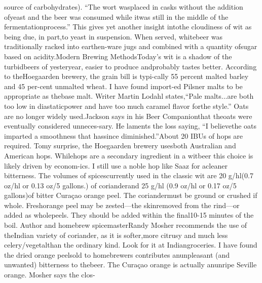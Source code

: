 \documentclass[a4paper,parskip=half]{scrartcl}
\begin{document}
source of carbohydrates). “The wort wasplaced in casks without the addition ofyeast and the beer was consumed while itwas still in the middle of the fermentationprocess.” This gives yet another insight intothe cloudiness of wit as being due, in part,to yeast in suspension. When served, whitebeer was traditionally racked into earthen-ware jugs and combined with a quantity ofsugar based on acidity.Modern Brewing MethodsToday’s wit is a shadow of the turbidbeers of yesteryear, easier to produce andprobably tastes better. According to theHoegaarden brewery, the grain bill is typi-cally 55 percent malted barley and 45 per-cent unmalted wheat. I have found import-ed Pilsner malts to be appropriate as thebase malt. Writer Martin Lodahl states,“Pale malts...are both too low in diastaticpower and have too much caramel flavor forthe style.” Oats are no longer widely used.Jackson says in his Beer Companionthat theoats were eventually considered unneces-sary. He laments the loss saying, “I believethe oats imparted a smoothness that hassince diminished.”About 20 IBUs of hops are required. Tomy surprise, the Hoegaarden brewery usesboth Australian and American hops. Whilehops are a secondary ingredient in a witbeer this choice is likely driven by econom-ics. I still use a noble hop like Saaz for acleaner bitterness. The volumes of spicescurrently used in the classic wit are 20 g/hl(0.7 oz/hl or 0.13 oz/5 gallons.) of corianderand 25 g/hl (0.9 oz/hl or 0.17 oz/5 gallons)of bitter Curaçao orange peel. The coriandermust be ground or crushed if whole. Freshorange peel may be zested—the skinremoved from the rind—or added as wholepeels. They should be added within the final10-15 minutes of the boil. Author and homebrew spicemasterRandy Mosher recommends the use of theIndian variety of coriander, as it is softer,more citrusy and much less celery/vegetalthan the ordinary kind. Look for it at Indiangroceries. I have found the dried orange peelsold to homebrewers contributes anunpleasant (and unwanted) bitterness to thebeer. The Curaçao orange is actually anunripe Seville orange. Mosher says the clos-

\parencite[31]{Sparrow2002} 
\end{document}
